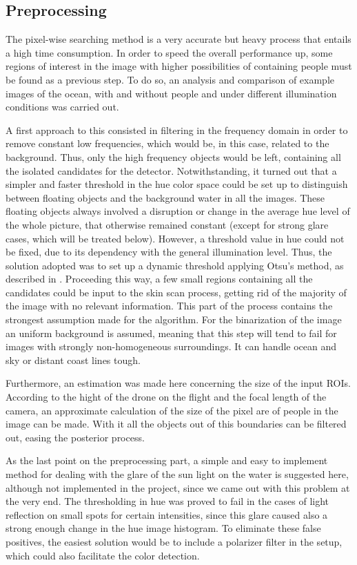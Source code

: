 \subsection{Preprocessing}
The pixel-wise searching method is a very accurate but heavy process that entails a high time consumption.
In order to speed the overall performance up, some regions of interest in the image with higher possibilities of containing people must be found as a previous step. To do so, an analysis and comparison of example images of the ocean, with and without people and under different illumination conditions was carried out.  

A first approach to this consisted in filtering in the frequency domain in order to remove constant low frequencies, which would be, in this case, related to the background. Thus, only the high frequency objects would be left, containing all the isolated candidates for the detector.
Notwithstanding, it turned out that a simpler and faster threshold in the hue color space could be set up to distinguish between floating objects and the background water in all the images. 
These floating objects always involved a disruption or change in the average hue level of the whole picture, that otherwise remained constant (except for strong glare cases, which will be treated below).
However, a threshold value in hue could not be fixed, due to its dependency with the general illumination level. 
Thus, the solution adopted was to set up a dynamic threshold applying Otsu's method, as described in \cite{Ref:Otsu}.
Proceeding this way, a few small regions containing all the candidates could be input to the skin scan process, getting rid of the majority of the image with no relevant information. 
This part of the process contains the strongest assumption made for the algorithm. 
For the binarization of the image an uniform background is assumed, meaning that this step will tend to fail for images with strongly non-homogeneous surroundings. 
It can handle ocean and sky or distant coast lines tough. 

Furthermore, an estimation was made here concerning the size of the input ROIs. 
According to the hight of the drone on the flight and the focal length of the camera, an approximate calculation of the size of the pixel are of people in the image can be made. 
With it all the objects out of this boundaries can be filtered out, easing the posterior process.

As the last point on the preprocessing part, a simple and easy to implement method for dealing with the glare of the sun light on the water is suggested here, although not implemented in the project, since we came out with this problem at the very end.
The thresholding in hue was proved to fail in the cases of light reflection on small spots for certain intensities, since this glare caused also a strong enough change in the hue image histogram. To eliminate these false positives, the easiest solution would be to include a polarizer filter in the setup, which could also facilitate the color detection. 

